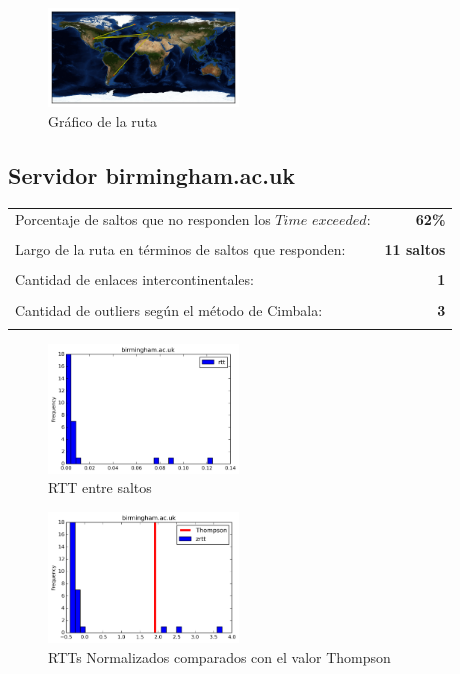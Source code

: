 \begin{figure}[H]
  \centering
    \includegraphics[width=0.45\textwidth]{grafico-rutas/bifrost-is.png}
  \caption{Gráfico de la ruta}
  \label{entropia-s}
\end{figure}




\subsection{Servidor birmingham.ac.uk}

\begin{center}
\begin{tabular}{p{6.5cm}r}
Porcentaje de saltos que no responden los $Time$ $exceeded$: & \textbf{62\%} \\ \\ 
Largo de la ruta en términos de saltos que responden: &\textbf{11 saltos} \\ \\
Cantidad de enlaces intercontinentales: & \textbf{1} \\ \\
Cantidad de outliers según el método de Cimbala: & \textbf{3} \\ \\
\end{tabular}
\end{center}

\begin{figure}[H]
  \centering
    \includegraphics[width=0.45\textwidth]{histogramas_rtt/birmingham-ac-uk.png}
  \caption{RTT entre saltos}
  \label{entropia-s}
\end{figure}

\begin{figure}[H]
  \centering
    \includegraphics[width=0.45\textwidth]{histogramas_thompson/birmingham-ac-uk.png}
  \caption{RTTs Normalizados comparados con el valor Thompson}
  \label{entropia-s}
\end{figure}


